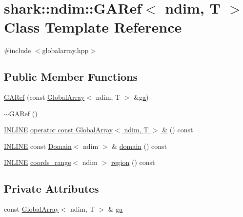 \hypertarget{classshark_1_1ndim_1_1_g_a_ref}{}\section{shark\+:\+:ndim\+:\+:G\+A\+Ref$<$ ndim, T $>$ Class Template Reference}
\label{classshark_1_1ndim_1_1_g_a_ref}


{\ttfamily \#include $<$globalarray.\+hpp$>$}

\subsection*{Public Member Functions}
\begin{DoxyCompactItemize}
\item 
\hyperlink{classshark_1_1ndim_1_1_g_a_ref_ac41de048bf27725936cf6f6daeb5cbdf}{G\+A\+Ref} (const \hyperlink{classshark_1_1ndim_1_1_global_array}{Global\+Array}$<$ ndim, T $>$ \&\hyperlink{classshark_1_1ndim_1_1_g_a_ref_ad52c83aede31478298662b70dcc781d7}{ga})
\item 
\hyperlink{classshark_1_1ndim_1_1_g_a_ref_a67d5772ab97d3035279524556822629e}{$\sim$\+G\+A\+Ref} ()
\item 
\hyperlink{common_8hpp_a2eb6f9e0395b47b8d5e3eeae4fe0c116}{I\+N\+L\+I\+NE} \hyperlink{classshark_1_1ndim_1_1_g_a_ref_a8e91514ad426ea441967f47e144f3e2f}{operator const Global\+Array$<$ ndim, T $>$ \&} () const
\item 
\hyperlink{common_8hpp_a2eb6f9e0395b47b8d5e3eeae4fe0c116}{I\+N\+L\+I\+NE} const \hyperlink{classshark_1_1ndim_1_1_domain}{Domain}$<$ ndim $>$ \& \hyperlink{classshark_1_1ndim_1_1_g_a_ref_aac65b9779fa791e2091e6a04419b972f}{domain} () const
\item 
\hyperlink{common_8hpp_a2eb6f9e0395b47b8d5e3eeae4fe0c116}{I\+N\+L\+I\+NE} \hyperlink{structshark_1_1ndim_1_1coords__range}{coords\+\_\+range}$<$ ndim $>$ \hyperlink{classshark_1_1ndim_1_1_g_a_ref_a65c5372c1c28b8f5179d59ecf23304fb}{region} () const
\end{DoxyCompactItemize}
\subsection*{Private Attributes}
\begin{DoxyCompactItemize}
\item 
const \hyperlink{classshark_1_1ndim_1_1_global_array}{Global\+Array}$<$ ndim, T $>$ \& \hyperlink{classshark_1_1ndim_1_1_g_a_ref_ad52c83aede31478298662b70dcc781d7}{ga}
\end{DoxyCompactItemize}


